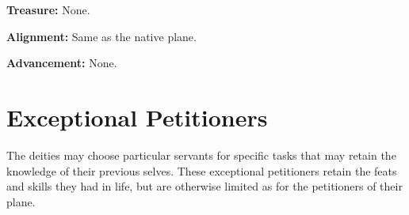 \documentclass{article}
\begin{document}
\textbf{Treasure:} None.

\textbf{Alignment: }Same as the native plane.

\textbf{Advancement: }None.

\vspace{12pt}
\section*{Exceptional Petitioners}

The deities may choose particular servants for specific tasks that may retain the 
knowledge of their previous selves. These exceptional petitioners retain the feats 
and skills they had in life, but are otherwise limited as for the petitioners of 
their plane.

\newpage
\end{document}
